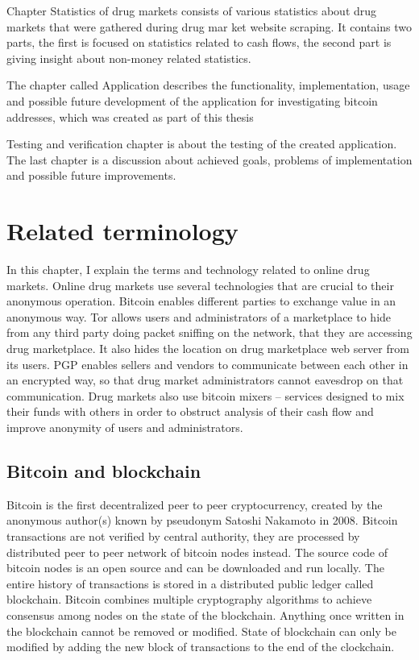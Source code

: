 \documentclass[
  digital, %
  table,   %
  lof,     %
  lot,     %
  oneside
]{fithesis3}
\begin{document}
Chapter Statistics of drug markets consists of various statistics about drug markets that were gathered during drug mar
ket website scraping.
It contains two parts, the first is focused on statistics related to cash flows, the second part is giving insight about
 non-money related statistics.

The chapter called Application describes the functionality, implementation, usage and 
possible future development of the application for investigating bitcoin addresses, which was created as part of this thesis

Testing and verification chapter is about the testing of the created application.
The last chapter is a discussion about achieved goals, problems of implementation and possible future improvements.

\chapter{Related terminology}

In this chapter, I explain the terms and technology related to online drug markets.
Online drug markets use several technologies that are crucial to their anonymous operation.
Bitcoin enables different parties to exchange value in an anonymous way.
Tor allows users and administrators of a marketplace to hide from any third party doing packet sniffing on the network,
that they are accessing drug marketplace. It also hides the location on drug marketplace web server from its users.
PGP enables sellers and vendors to communicate between each other in an encrypted way,
so that drug market administrators cannot eavesdrop on that communication.
Drug markets also use bitcoin mixers -- services designed to mix their funds with others in order to obstruct
analysis of their cash flow and improve anonymity of users and administrators.

\section{Bitcoin and blockchain}

Bitcoin \parencite{nakamoto2008bitcoin} is the first decentralized peer to peer cryptocurrency,
created by the anonymous author(s) known by pseudonym Satoshi Nakamoto in 2008.
Bitcoin transactions are not verified by central authority, they are processed by distributed peer to peer network of bitcoin nodes instead. 
The source code of bitcoin nodes is an open source and can be downloaded and run locally. 
The entire history of transactions is stored in a distributed public ledger called blockchain.
Bitcoin combines multiple cryptography algorithms to achieve consensus among nodes
on the state of the blockchain. Anything once written in the blockchain
cannot be removed or modified. State of blockchain can only be modified by adding the new block of transactions to the end of the clockchain.
\end{document}

